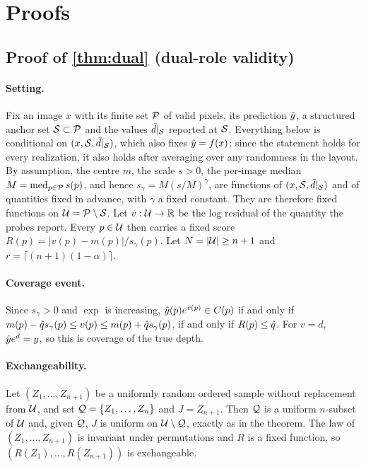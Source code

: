 \section{Proofs}
\label{app:proofs}

\subsection{Proof of \cref{thm:dual} (dual-role validity)}
\label{app:proof-dual}

\paragraph{Setting.}
Fix an image $x$ with its finite set $\mathcal{P}$ of valid pixels, its prediction $\hat{y}$, a structured anchor set $\mathcal{S}\subset\mathcal{P}$ and the values $\tilde{d}|_{\mathcal{S}}$ reported at $\mathcal{S}$.
Everything below is conditional on $(x,\mathcal{S},\tilde{d}|_{\mathcal{S}})$, which also fixes $\hat{y}=f(x)$; since the statement holds for every realization, it also holds after averaging over any randomness in the layout.
By assumption, the centre $m$, the scale $s>0$, the per-image median $M=\operatorname{med}_{p\in\mathcal{P}}s(p)$, and hence $s_\gamma=M(s/M)^\gamma$, are functions of $(x,\mathcal{S},\tilde{d}|_{\mathcal{S}})$ and of quantities fixed in advance, with $\gamma$ a fixed constant.
They are therefore fixed functions on $\mathcal{U}=\mathcal{P}\setminus\mathcal{S}$.
Let $v:\mathcal{U}\to\mathbb{R}$ be the log residual of the quantity the probes report.
Every $p\in\mathcal{U}$ then carries a fixed score $R(p)=|v(p)-m(p)|/s_\gamma(p)$.
Let $N=|\mathcal{U}|\ge n+1$ and $r=\lceil(n+1)(1-\alpha)\rceil$.

\paragraph{Coverage event.}
Since $s_\gamma>0$ and $\exp$ is increasing, $\hat{y}(p)e^{v(p)}\in C(p)$ if and only if $m(p)-\hat{q} s_\gamma(p)\le v(p)\le m(p)+\hat{q} s_\gamma(p)$, \ie if and only if $R(p)\le\hat{q}$.
For $v=d$, $\hat{y} e^{d}=y$, so this is coverage of the true depth.

\paragraph{Exchangeability.}
Let $(Z_1,\dots,Z_{n+1})$ be a uniformly random ordered sample without replacement from $\mathcal{U}$, and set $\mathcal{Q}=\{Z_1,\dots,Z_n\}$ and $J=Z_{n+1}$.
Then $\mathcal{Q}$ is a uniform $n$-subset of $\mathcal{U}$ and, given $\mathcal{Q}$, $J$ is uniform on $\mathcal{U}\setminus\mathcal{Q}$, exactly as in the theorem.
The law of $(Z_1,\dots,Z_{n+1})$ is invariant under permutations and $R$ is a fixed function, so $(R(Z_1),\dots,R(Z_{n+1}))$ is exchangeable.

